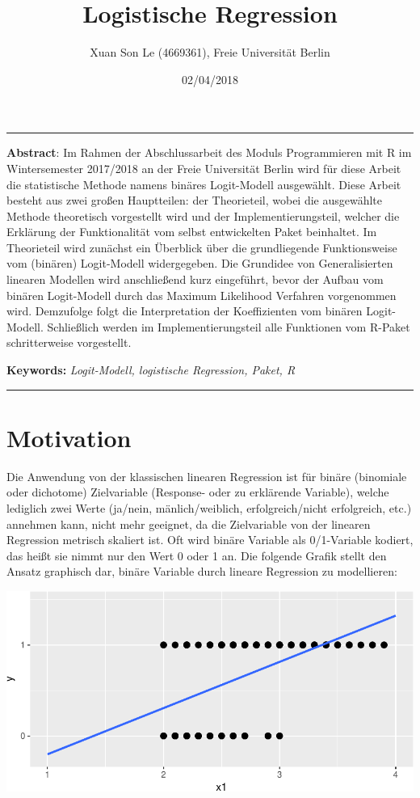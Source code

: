 \documentclass[12pt,]{article}
\title{\textbf{Logistische Regression}}
\author{Xuan Son Le (4669361), Freie Universität Berlin}
\date{02/04/2018}
\begin{document}
\maketitle

\begin{center}\rule{0.5\linewidth}{\linethickness}\end{center}

\textbf{Abstract}: Im Rahmen der Abschlussarbeit des Moduls
Programmieren mit R im Wintersemester 2017/2018 an der Freie Universität
Berlin wird für diese Arbeit die statistische Methode namens binäres
Logit-Modell ausgewählt. Diese Arbeit besteht aus zwei großen
Hauptteilen: der Theorieteil, wobei die ausgewählte Methode theoretisch
vorgestellt wird und der Implementierungsteil, welcher die Erklärung der
Funktionalität vom selbst entwickelten Paket beinhaltet. Im Theorieteil
wird zunächst ein Überblick über die grundliegende Funktionsweise vom
(binären) Logit-Modell widergegeben. Die Grundidee von Generalisierten
linearen Modellen wird anschließend kurz eingeführt, bevor der Aufbau
vom binären Logit-Modell durch das Maximum Likelihood Verfahren
vorgenommen wird. Demzufolge folgt die Interpretation der Koeffizienten
vom binären Logit-Modell. Schließlich werden im Implementierungsteil
alle Funktionen vom R-Paket schritterweise vorgestellt.

\textbf{Keywords:} \emph{Logit-Modell, logistische Regression, Paket, R}

\begin{center}\rule{0.5\linewidth}{\linethickness}\end{center}

\newpage

\section{Motivation}\label{motivation}

Die Anwendung von der klassischen linearen Regression ist für binäre
(binomiale oder dichotome) Zielvariable (Response- oder zu erklärende
Variable), welche lediglich zwei Werte (ja/nein, mänlich/weiblich,
erfolgreich/nicht erfolgreich, etc.) annehmen kann, nicht mehr geeignet,
da die Zielvariable von der linearen Regression metrisch skaliert ist.
Oft wird binäre Variable als 0/1-Variable kodiert, das heißt sie nimmt
nur den Wert 0 oder 1 an. Die folgende Grafik stellt den Ansatz
graphisch dar, binäre Variable durch lineare Regression zu modellieren:

\includegraphics{logisticRegression_files/figure-latex/unnamed-chunk-1-1.pdf}
\end{document}

